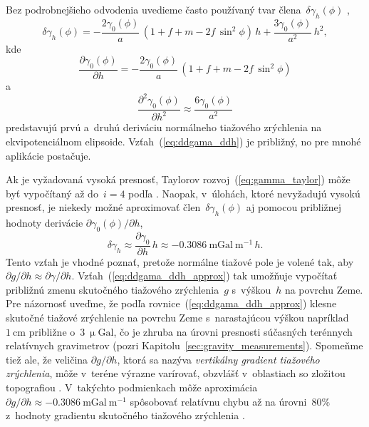\documentclass[a4paper, 12pt]{book}
\begin{document}
Bez podrobnejšieho odvodenia uvedieme často používaný tvar 
člena~$\delta\gamma_h(\phi)$ \parencite[pozri 
napríklad][]{MoritzPhysicalGeodesy},
%
\begin{equation}
\delta\gamma_h(\phi) = -\frac{2\gamma_0(\phi)}{a} \, (1 + f + m - 2f \, 
\sin^2\phi) \, h + \frac{3\gamma_0(\phi)}{a^2} \, h^2{,}
\end{equation}
%
kde
%
\begin{equation}
\frac{\partial \gamma_0(\phi)}{\partial h} = -\frac{2\gamma_0(\phi)}{a} \, (1 
+ f + m - 2f \, \sin^2\phi)
\end{equation}
%
a
%
\begin{equation}
\label{eq:ddgama_ddh}
\frac{\partial^2 \gamma_0(\phi)}{\partial h^2} \approx 
\frac{6\gamma_0(\phi)}{a^2}
\end{equation}
%
predstavujú prvú a~druhú deriváciu normálneho tiažového zrýchlenia na 
ekvipotenciálnom elipsoide.  Vzťah~(\ref{eq:ddgama_ddh}) je približný, no pre 
mnohé aplikácie postačuje.

Ak je vyžadovaná vysoká presnosť, Taylorov rozvoj~(\ref{eq:gamma_taylor}) môže 
byť vypočítaný až do~$i = 4$ podľa \textcite{Pick2000}.  Naopak, v~úlohách, 
ktoré nevyžadujú vysokú presnosť, je niekedy možné aproximovať 
člen~$\delta\gamma_h(\phi)$ aj pomocou približnej hodnoty derivácie $\partial 
\gamma_0(\phi) \slash \partial h$,
%
\begin{equation}
\label{eq:ddgama_ddh_approx}
\delta\gamma_h \approx \frac{\partial \gamma_0}{\partial h} \, h \approx 
-0.3086 \ \mathrm{mGal} \ \mathrm{m}^{-1} \, h{.}
\end{equation}
%
Tento vzťah je vhodné poznať, pretože normálne tiažové pole je volené tak, aby 
$\partial g \slash \partial h \approx \partial \gamma \slash \partial h$.  
Vzťah~(\ref{eq:ddgama_ddh_approx}) tak umožňuje vypočítať približnú zmenu 
skutočného tiažového zrýchlenia~$g$ s~výškou~$h$ na povrchu Zeme.  Pre 
názornosť uveďme, že podľa rovnice~(\ref{eq:ddgama_ddh_approx}) klesne skutočné 
tiažové zrýchlenie na povrchu Zeme s~narastajúcou výškou napríklad~$1 
\ \mathrm{cm}$ približne o~$3 \ \upmu\mathrm{Gal}$, čo je zhruba na úrovni 
presnosti súčasných terénnych relatívnych gravimetrov (pozri 
Kapitolu~\ref{sec:gravity_measurements}).  Spomeňme tiež ale, že veličina 
$\partial g \slash \partial h$, ktorá sa nazýva \emph{vertikálny gradient 
tiažového zrýchlenia}, môže v~teréne výrazne varírovať, obzvlášť v~oblastiach 
so zložitou topografiou \parencite{Zahorec2018}.  V~takýchto podmienkach môže 
aproximácia~$\partial g \slash \partial h \approx -0.3086 \ \mathrm{mGal} 
\ \mathrm{m}^{-1}$ spôsobovať relatívnu chybu až na úrovni~$80 \%$ z~hodnoty 
gradientu skutočného tiažového zrýchlenia \parencite{Vajda2020a}.
\end{document}
